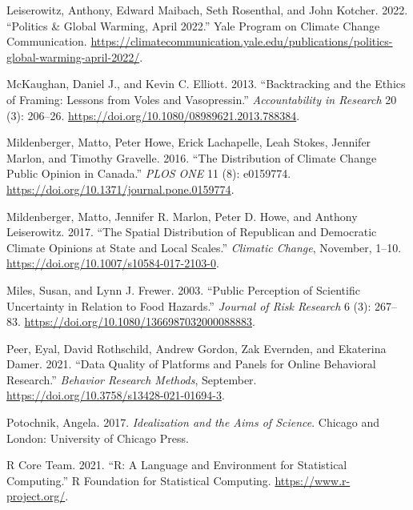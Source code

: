 \documentclass[
  letterpaper,
  DIV=11,
  numbers=noendperiod]{scrartcl}
\newlength{\cslhangindent}
\newlength{\cslentryspacingunit} %
\newenvironment{CSLReferences}[2] %
 {%
  \setlength{\parindent}{0pt}
  \ifodd #1
  \let\oldpar\par
  \def\par{\hangindent=\cslhangindent\oldpar}
  \fi
  \setlength{\parskip}{#2\cslentryspacingunit}
 }%
 {}
\begin{document}
\begin{CSLReferences}{1}{0}
\leavevmode{}%
Leiserowitz, Anthony, Edward Maibach, Seth Rosenthal, and John Kotcher.
2022. {``Politics \& Global Warming, April 2022.''} Yale Program on
Climate Change Communication.
\url{https://climatecommunication.yale.edu/publications/politics-global-warming-april-2022/}.

\leavevmode{}%
McKaughan, Daniel J., and Kevin C. Elliott. 2013. {``Backtracking and
the Ethics of Framing: Lessons from Voles and Vasopressin.''}
\emph{Accountability in Research} 20 (3): 206--26.
\url{https://doi.org/10.1080/08989621.2013.788384}.

\leavevmode{}%
Mildenberger, Matto, Peter Howe, Erick Lachapelle, Leah Stokes, Jennifer
Marlon, and Timothy Gravelle. 2016. {``The Distribution of Climate
Change Public Opinion in Canada.''} \emph{PLOS ONE} 11 (8): e0159774.
\url{https://doi.org/10.1371/journal.pone.0159774}.

\leavevmode{}%
Mildenberger, Matto, Jennifer R. Marlon, Peter D. Howe, and Anthony
Leiserowitz. 2017. {``The Spatial Distribution of Republican and
Democratic Climate Opinions at State and Local Scales.''} \emph{Climatic
Change}, November, 1--10.
\url{https://doi.org/10.1007/s10584-017-2103-0}.

\leavevmode{}%
Miles, Susan, and Lynn J. Frewer. 2003. {``Public Perception of
Scientific Uncertainty in Relation to Food Hazards.''} \emph{Journal of
Risk Research} 6 (3): 267--83.
\url{https://doi.org/10.1080/1366987032000088883}.

\leavevmode{}%
Peer, Eyal, David Rothschild, Andrew Gordon, Zak Evernden, and Ekaterina
Damer. 2021. {``Data Quality of Platforms and Panels for Online
Behavioral Research.''} \emph{Behavior Research Methods}, September.
\url{https://doi.org/10.3758/s13428-021-01694-3}.

\leavevmode{}%
Potochnik, Angela. 2017. \emph{Idealization and the Aims of Science}.
Chicago and London: University of Chicago Press.

\leavevmode{}%
R Core Team. 2021. {``R: A Language and Environment for Statistical
Computing.''} R Foundation for Statistical Computing.
\url{https://www.r-project.org/}.


\end{CSLReferences}
\end{document}
